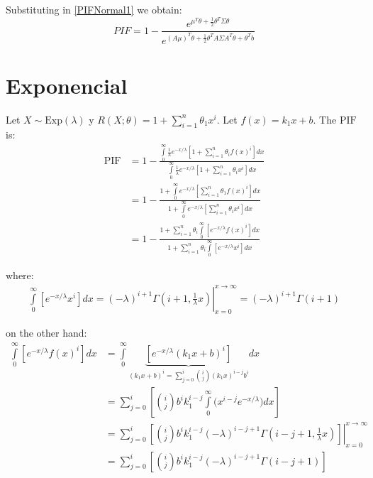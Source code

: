\documentclass{article}
\begin{document}
Substituting in \eqref{PIFNormal1} we obtain: 
\begin{equation}
    PIF = 1 - \frac{e^{\mu^{T} \theta + \frac{1}{2} \theta^T \Sigma \theta}}{e^{ (A \mu)^T \theta  + \frac{1}{2} \theta^T A \Sigma A^T \theta   +  \theta^T b}}
\end{equation}

\section{Exponencial}
Let $X \sim \textrm{Exp}(\lambda)$ y $R(X;\theta) = 1 + \sum\limits_{i = 1}^{n} \theta_1 x^{i}$. Let $f(x) = k_1 x + b$. The $\textrm{PIF}$ is:
\begin{equation} 
    \begin{aligned} \label{PIFEXP}
    \textrm{PIF} & = 1 - \frac{\int\limits_{0}^{\infty} \frac{1}{\lambda} e^{-x/\lambda} \left[ 1 + \sum\limits_{i = 1}^{n} \theta_i f(x)^{i} \right] dx}{\int\limits_{0}^{\infty} \frac{1}{\lambda} e^{-x/\lambda} \left[ 1 + \sum\limits_{i = 1}^{n} \theta_i x^{i} \right] dx} \\
    & = 1 - \frac{1 + \int\limits_{0}^{\infty}  e^{-x/\lambda} \left[  \sum\limits_{i = 1}^{n} \theta_1 f(x)^{i} \right] dx}{1 + \int\limits_{0}^{\infty}  e^{-x/\lambda} \left[ \sum\limits_{i = 1}^{n} \theta_i x^{i} \right] dx} \\
    & = 1 - \frac{1 +   \sum\limits_{i = 1}^{n} \theta_i \int\limits_{0}^{\infty}  \left[  e^{-x/\lambda}  f(x)^{i} \right] dx}{1 +   \sum\limits_{i = 1}^{n} \theta_i \int\limits_{0}^{\infty}  \left[  e^{-x/\lambda}  x^{i} \right] dx}  
    \end{aligned}
\end{equation} 

where: 
\begin{equation}
    \begin{aligned}
    \left. \int\limits_{0}^{\infty}  \left[  e^{-x/\lambda}  x^{i} \right] dx = (-\lambda)^{i + 1} \Gamma(i + 1, \frac{1}{\lambda} x) \right|^{x \to \infty}_{x = 0} = (-\lambda)^{i + 1} \Gamma(i + 1)
    \end{aligned}
\end{equation}

on the other hand: 
\begin{equation}
    \begin{aligned}
    \int\limits_{0}^{\infty}  \left[  e^{-x/\lambda}  f(x)^{i} \right] dx  & = \int\limits_{0}^{\infty}  \underbrace{\left[  e^{-x/\lambda}  (k_1 x + b)^{i} \right]}_{ (k_1 x + b)^{i} = \sum\limits_{j = 0}^{i} {i \choose j} (k_1 x)^{i - j} b^{i}} dx \\
    & = \sum\limits_{j = 0}^{i} \left[ {i \choose j} b^{i} k_1 ^{i - j} \int\limits_{0}^{\infty} \Big( x^{i - j}  e^{-x/\lambda} \Big) dx \right] \\ 
    & = \left. \sum\limits_{j = 0}^{i} \left[ {i \choose j} b^{i} k_1 ^{i - j}  (-\lambda)^{i - j + 1} \Gamma(i - j + 1, \frac{1}{\lambda} x) \right] \right|^{x \to \infty}_{x = 0} \\
    & = \sum\limits_{j = 0}^{i} \left[ {i \choose j} b^{i} k_1 ^{i - j}  (-\lambda)^{i - j + 1} \Gamma(i - j + 1) \right] 
    \end{aligned}
\end{equation}
\end{document}

